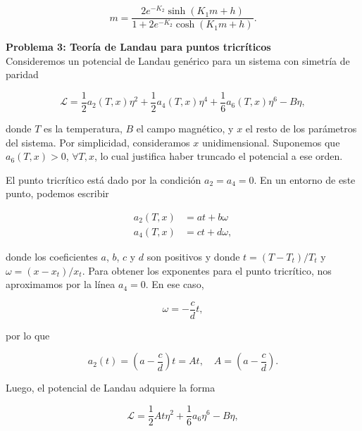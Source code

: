 \documentclass[10pt]{article}
\begin{document}
\begin{equation}
m = \dfrac{2e^{-K_2}\sinh\left( K_1 m + h \right)}{1+2e^{-K_2}\cosh\left( K_1 m + h \right)}.
\end{equation}

\pagebreak

\textbf{Problema 3: Teor\'ia de Landau para puntos tricr\'iticos}
\\

Consideremos un potencial de Landau gen\'erico para un sistema con simetr\'ia de paridad

\begin{equation}
\mathcal{L} = \dfrac{1}{2} a_2(T,x) \eta^2 + \dfrac{1}{2} a_4(T,x) \eta^4 + \dfrac{1}{6} a_6(T,x) \eta^6 - B \eta,
\end{equation}

donde $T$ es la temperatura, $B$ el campo magn\'etico, y $x$ el resto de los par\'ametros del sistema. Por simplicidad, consideramos $x$ unidimensional. Suponemos que $a_6(T,x) >0$, $\forall T,x$, lo cual justifica haber truncado el potencial a ese orden.

El punto tricr\'itico est\'a dado por la condici\'on $a_2 = a_4 = 0$. En un entorno de este punto, podemos escribir

\begin{align}
a_2(T,x) &= at + b\omega \label{eq:a2}\\
a_4(T,x) &= ct + d\omega, \label{eq:a4}
\end{align}

donde los coeficientes $a$, $b$, $c$ y $d$ son positivos y donde $t = (T - T_t)/T_t$ y $\omega = (x-x_t)/x_t$. Para obtener los exponentes para el punto tricr\'itico, nos aproximamos por la l\'inea $a_4 = 0$. En ese caso,

\begin{equation}
\omega = -\dfrac{c}{d}t,
\end{equation}

por lo que

\begin{equation}
a_2(t) = \left( a - \dfrac{c}{d}\right) t = A t,\quad A =  \left( a - \dfrac{c}{d}\right).
\end{equation}

Luego, el potencial de Landau adquiere la forma

\begin{equation}
\mathcal{L} = \dfrac{1}{2} A t \eta^2 + \dfrac{1}{6} a_6 \eta^6 - B \eta,
\end{equation}
\end{document}
